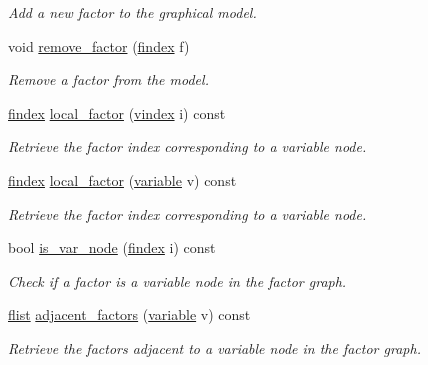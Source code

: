 \begin{DoxyCompactItemize}
\begin{DoxyCompactList}\small\item\em Add a new factor to the graphical model. \end{DoxyCompactList}\item 
void \hyperlink{classmerlin_1_1factor__graph_aa7a98b7b90992b7dcab7a7b35793fc1f}{remove\+\_\+factor} (\hyperlink{classmerlin_1_1factor__graph_a533556bd4ec6961b63a91a80a8a37508}{findex} f)
\begin{DoxyCompactList}\small\item\em Remove a factor from the model. \end{DoxyCompactList}\item 
\hyperlink{classmerlin_1_1factor__graph_a533556bd4ec6961b63a91a80a8a37508}{findex} \hyperlink{classmerlin_1_1factor__graph_ae1afcb1e51c9a18d15c5cadc37a4ca8b}{local\+\_\+factor} (\hyperlink{classmerlin_1_1factor__graph_a6b8a8220d86d6a6f91a8d2c7dd00ddc9}{vindex} i) const 
\begin{DoxyCompactList}\small\item\em Retrieve the factor index corresponding to a variable node. \end{DoxyCompactList}\item 
\hyperlink{classmerlin_1_1factor__graph_a533556bd4ec6961b63a91a80a8a37508}{findex} \hyperlink{classmerlin_1_1factor__graph_ad4789b9f75a841d7170c6bc4e8912b26}{local\+\_\+factor} (\hyperlink{classmerlin_1_1variable}{variable} v) const 
\begin{DoxyCompactList}\small\item\em Retrieve the factor index corresponding to a variable node. \end{DoxyCompactList}\item 
bool \hyperlink{classmerlin_1_1factor__graph_ac0632388a94e4ed45ed31a5130043f14}{is\+\_\+var\+\_\+node} (\hyperlink{classmerlin_1_1factor__graph_a533556bd4ec6961b63a91a80a8a37508}{findex} i) const 
\begin{DoxyCompactList}\small\item\em Check if a factor is a variable node in the factor graph. \end{DoxyCompactList}\item 
\hyperlink{classmerlin_1_1factor__graph_a48dec4ea8a655315053984a81fe93ebc}{flist} \hyperlink{classmerlin_1_1factor__graph_a88b2d9a79901b3dbfda925f61fa070e2}{adjacent\+\_\+factors} (\hyperlink{classmerlin_1_1variable}{variable} v) const 
\begin{DoxyCompactList}\small\item\em Retrieve the factors adjacent to a variable node in the factor graph. \end{DoxyCompactList}\item 

\end{DoxyCompactItemize}
